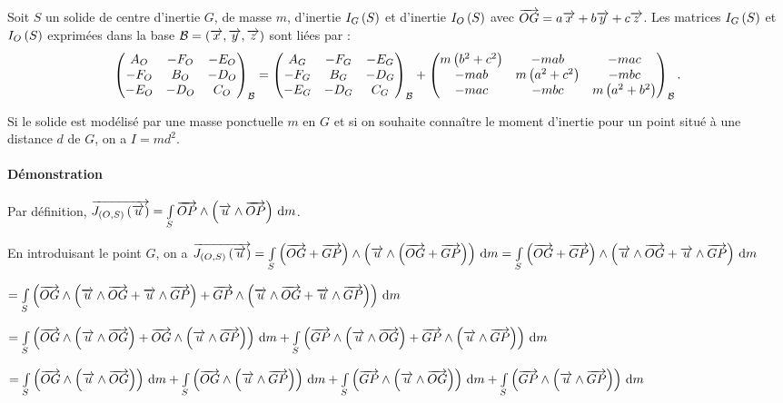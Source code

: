 \documentclass[10pt,fleqn]{article} %
\begin{document}
\begin{theorem}
Soit $S$ un solide de centre d'inertie $G$, de masse $m$, d'inertie $\inertie{G}{S}$ et d'inertie $\inertie{O}{S}$ avec $\vect{OG}=a\vect{x}+b\vect{y}+c\vect{z}$. Les matrices $\inertie{G}{S}$ et $\inertie{O}{S}$ exprimées dans la base $\mathcal{B}=\base{x}{y}{z}$ sont liées par : 
$$
\matinertie{A_O}{B_O}{C_O}{-D_O}{-E_O}{-F_O}{\mathcal{B}}
= \matinertie{A_G}{B_G}{C_G}{-D_G}{-E_G}{-F_G}{\mathcal{B}}
+ \matinertie{m\left(b^2+c^2\right)}{m\left(a^2+c^2\right)}{m\left(a^2+b^2\right)}{-mbc}{-mac}{-mab}{\mathcal{B}}.
$$


Si le solide est modélisé par une masse ponctuelle $m$ en $G$ et si on souhaite connaître le moment d'inertie pour un point situé à une distance $d$ de $G$, on a $I=md^2$.

\end{theorem}

\paragraph*{Démonstration}

Par définition, 
$\vect{J_{\left(O,S\right)}\left(\vect{u}\right)} 
= \int\limits_{S} \vect{OP}\wedge \left(\vect{u}\wedge \vect{OP}\right)\,\dd m
$. 

En introduisant le point $G$, on a 
$\vect{J_{\left(O,S\right)}\left(\vect{u}\right)} 
= \int\limits_{S} \left(\vect{OG}+\vect{GP} \right) \wedge \left(\vect{u}\wedge \left(\vect{OG}+\vect{GP} \right) \right)\,\dd m
= \int\limits_{S} \left(\vect{OG}+\vect{GP} \right) \wedge \left(\vect{u}\wedge\vect{OG}+\vect{u}\wedge \vect{GP} \right)\,\dd m
$
 
$= \int\limits_{S} \left(\vect{OG} \wedge \left(\vect{u}\wedge\vect{OG}+\vect{u}\wedge \vect{GP} \right) +\vect{GP}\wedge \left(\vect{u}\wedge\vect{OG}+\vect{u}\wedge \vect{GP} \right) \right) \,\dd m
$ 

$= \int\limits_{S} \left(\vect{OG} \wedge \left(\vect{u}\wedge\vect{OG}\right) +\vect{OG} \wedge \left(\vect{u}\wedge \vect{GP} \right) \right) \,\dd m+ \int\limits_{S} \left( \vect{GP}\wedge \left(\vect{u}\wedge\vect{OG}\right)+\vect{GP}\wedge \left(\vect{u}\wedge \vect{GP} \right) \right) \,\dd m
$ 


$= \int\limits_{S} \left(\vect{OG} \wedge \left(\vect{u}\wedge\vect{OG}\right) \right) \,\dd m
+\int\limits_{S} \left(\vect{OG} \wedge \left(\vect{u}\wedge \vect{GP} \right) \right) \,\dd m
+\int\limits_{S} \left( \vect{GP}\wedge \left(\vect{u}\wedge\vect{OG}\right)\right) \,\dd m
+\int\limits_{S} \left(\vect{GP}\wedge \left(\vect{u}\wedge \vect{GP} \right) \right) \,\dd m
$ 
\end{document}
